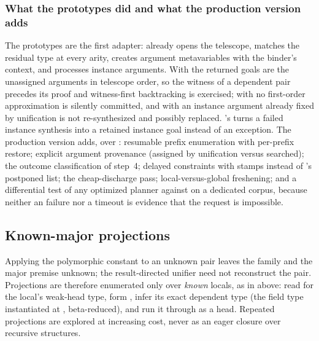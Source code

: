 \subsubsection{What the prototypes did and what the production version adds}

The prototypes are the first adapter:  already opens the telescope, matches the residual type at every arity, creates argument metavariables with the binder's context, and processes instance arguments. With  the returned goals are the unassigned arguments in telescope order, so the witness of a dependent pair precedes its proof and witness-first backtracking is exercised; with  no first-order approximation is silently committed, and with  an instance argument already fixed by unification is not re-synthesized and possibly replaced. 's  turns a failed instance synthesis into a retained instance goal instead of an exception. The production version adds, over : resumable prefix enumeration with per-prefix restore; explicit argument provenance (assigned by unification versus searched); the outcome classification of step~4; delayed constraints with stamps instead of 's postponed list; the cheap-discharge pass; local-versus-global freshening; and a differential test of any optimized planner against  on a dedicated corpus, because neither an  failure nor a timeout is evidence that the request is impossible.

\subsection{Known-major projections}\label{alg:proj}

Applying the polymorphic constant  to an unknown pair leaves the family and the major premise unknown; the result-directed unifier need not reconstruct the pair. Projections are therefore enumerated only over \emph{known} locals, as in  above: read  for the local's weak-head type, form , infer its exact dependent type (the field type instantiated at , beta-reduced), and run it through  as a head. Repeated projections are explored at increasing cost, never as an eager closure over recursive structures.

